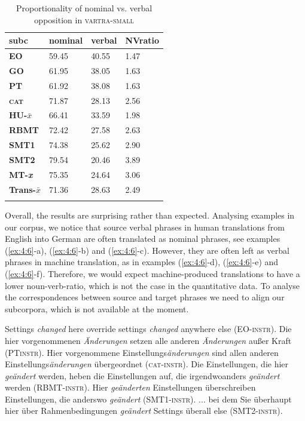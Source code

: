 \documentclass[output=paper]{LSP/langsci}
\begin{document}
\begin{table}
     \centering
     \begin{tabular}{llll}
\lsptoprule
\textbf{subc}    & \textbf{nominal}  & \textbf{verbal}  & \textbf{NVratio} \\ \midrule
\textbf{EO}    & 59.45   & 40.55  & 1.47 \\ \midrule
\textbf{GO}    & 61.95   & 38.05  & 1.63 \\ \midrule
\textbf{PT}    & 61.92	 & 38.08  & 1.63 \\
\textbf{\textsc{cat}}   & 71.87   & 28.13  & 2.56  \\ \midrule
\textbf{HU-$\bar{x}$}   & 66.41  & 33.59   & 1.98\\ \midrule
\textbf{RBMT}  & 72.42   & 27.58  & 2.63 \\
\textbf{SMT1}  & 74.38	 & 25.62  & 2.90 \\
\textbf{SMT2}  & 79.54   & 20.46  & 3.89 \\ \midrule
\textbf{MT-\textit{x}}   & 75.35  & 24.64  & 3.06 \\ \midrule
\textbf{Trans-$\bar{x}$} & 71.36 & 28.63  & 2.49 \\ 
\lspbottomrule
     \end{tabular}

 \caption{Proportionality of nominal vs. verbal opposition in \textsc{vartra}-\textsc{small}}
     \label{tab:4.4}
\end{table}


Overall, the results are surprising rather than expected. Analysing examples in our corpus, we notice that source verbal phrases in human translations from English into German are often translated as nominal phrases, see examples (\ref{ex:4:6}-a), (\ref{ex:4:6}-b) and (\ref{ex:4:6}-c). However, they are often left as verbal phrases in machine translation, as in examples (\ref{ex:4:6}-d), (\ref{ex:4:6}-e) and (\ref{ex:4:6}-f). Therefore, we would expect machine-produced translations to have a lower noun-verb-ratio, which is not the case in the quantitative data.  To analyse the correspondences between source and target phrases we need to align our subcorpora, which is not available at the moment.

\ea \label{ex:4:6}
\ea Settings \textit{changed} here override settings \textit{changed} anywhere else (EO-\textsc{instr}).
\ex Die hier vorgenommenen \textit{Änderungen} setzen alle anderen \textit{Änderungen} außer Kraft (PT\textsc{instr}).
\ex Hier vorgenommene Einstellungs\textit{änderungen} sind allen anderen Einstellungs\textit{änderungen} übergeordnet (\textsc{cat}-\textsc{instr}).
\ex Die Einstellungen, die hier \textit{geändert} werden, heben die Einstellungen auf, die irgendwoanders \textit{geändert} werden (RBMT-\textsc{instr}).
\ex Hier \textit{geänderten} Einstellungen überschreiben Einstellungen, die anderswo \textit{geändert} (SMT1-\textsc{instr}).
\ex ... bei dem Sie überhaupt hier über Rahmenbedingungen \textit{geändert} Settings überall else (SMT2-\textsc{instr}).
\z
\z
\end{document}
